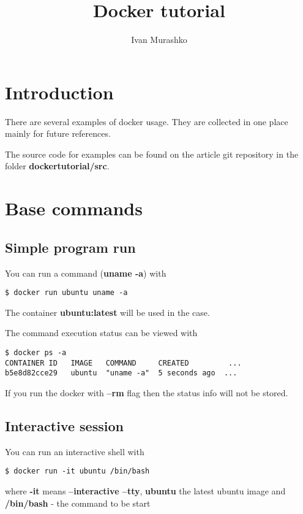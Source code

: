 \documentclass[14pt,a4paper]{article}
\title{Docker tutorial}
\author{Ivan Murashko}
\date{}
\begin{document}
\maketitle
\tableofcontents

\section*{Introduction}
There are several examples of docker usage. They are collected in one
place mainly for future references.

The source code for examples can be found on the article git
repository \cite{github:articles_ivanmurashko} in the folder 
\textbf{dockertutorial/src}.

\section{Base commands}

\subsection{Simple program run}
You can run a command (\textbf{uname -a}) with 
\begin{verbatim}
$ docker run ubuntu uname -a
\end{verbatim}
The container \textbf{ubuntu:latest} will be used in the case. 

The command execution status can be viewed with
\begin{verbatim}
$ docker ps -a 
CONTAINER ID   IMAGE   COMMAND     CREATED         ...
b5e8d82cce29   ubuntu  "uname -a"  5 seconds ago  ...
\end{verbatim}
If you run the docker with \textbf{--rm} flag then the status info
will not be stored.


\subsection{Interactive session}
You can run an interactive shell with
\begin{verbatim}
$ docker run -it ubuntu /bin/bash
\end{verbatim}
where \textbf{-it} means \textbf{--interactive --tty}, 
\textbf{ubuntu} the latest ubuntu image and \textbf{/bin/bash} - the
command to be start 
\end{document}
